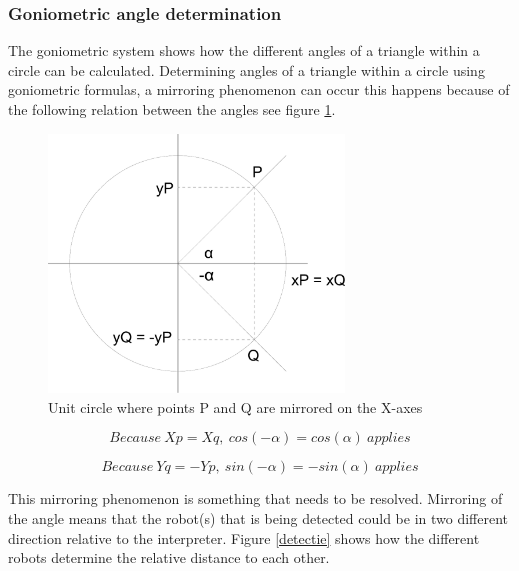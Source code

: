 \documentclass[10pt,a4paper]{article}
\begin{document}
\subsubsection{Goniometric angle determination}
The goniometric system shows how the different angles of a triangle within a circle can be calculated. Determining angles of a triangle within a circle using goniometric formulas, a mirroring phenomenon can occur this happens because of the following relation between the angles see figure \ref{circle}.

\begin{figure}[H]
\centering
\includegraphics[width=0.7\textwidth]{Cirkel.pdf}
\caption{Unit circle where points P and Q are mirrored on the X-axes}
\label{circle}
\end{figure}

\begin{equation}
Because\ Xp = Xq,\ cos(-\alpha) = cos(\alpha)\ applies
\end{equation}

\begin{equation}
Because\ Yq = -Yp,\ sin(-\alpha) = -sin(\alpha)\ applies
\end{equation}

This mirroring phenomenon is something that needs to be resolved. Mirroring of the angle means that the robot(s) that is being detected could be in two different direction relative to the interpreter. Figure \ref{detectie} shows how the different robots determine the relative distance to each other. 
\end{document}
